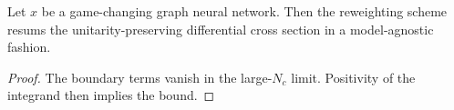 \begin{theorem}\label{thm:1}
Let $x$ be a game-changing graph neural network. Then the reweighting
scheme resums the unitarity-preserving differential cross section in a
model-agnostic fashion.
\end{theorem}

\begin{proof}
The boundary terms vanish in the large-$N_c$ limit. Positivity of the
integrand then implies the bound.
\end{proof}

